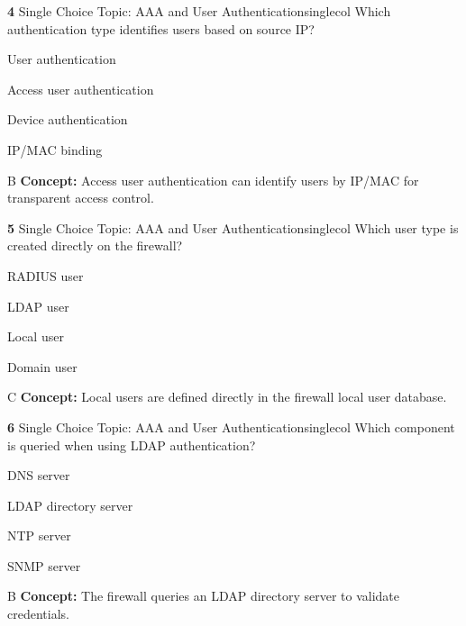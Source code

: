 \documentclass[10pt,a4paper]{article}
\begin{document}
\begin{qcard}{\color{white}\textbf{4} \hfill \small Single Choice \textbar{} Topic: AAA and User Authentication}{singlecol}
Which authentication type identifies users based on source IP?

\begin{qoptions}
\item User authentication
\item Access user authentication
\item Device authentication
\item IP/MAC binding
\end{qoptions}
\begin{explainbox}{B}
\textbf{Concept:} Access user authentication can identify users by IP/MAC for transparent access control.
\end{explainbox}
\end{qcard}

\begin{qcard}{\color{white}\textbf{5} \hfill \small Single Choice \textbar{} Topic: AAA and User Authentication}{singlecol}
Which user type is created directly on the firewall?

\begin{qoptions}
\item RADIUS user
\item LDAP user
\item Local user
\item Domain user
\end{qoptions}
\begin{explainbox}{C}
\textbf{Concept:} Local users are defined directly in the firewall local user database.
\end{explainbox}
\end{qcard}

\begin{qcard}{\color{white}\textbf{6} \hfill \small Single Choice \textbar{} Topic: AAA and User Authentication}{singlecol}
Which component is queried when using LDAP authentication?

\begin{qoptions}
\item DNS server
\item LDAP directory server
\item NTP server
\item SNMP server
\end{qoptions}
\begin{explainbox}{B}
\textbf{Concept:} The firewall queries an LDAP directory server to validate credentials.
\end{explainbox}
\end{qcard}
\end{document}
